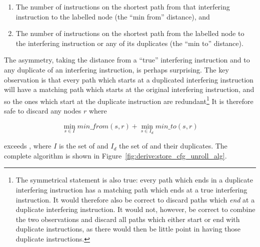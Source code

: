 \begin{enumerate}
\item
  The number of instructions on the shortest path from that
  interfering instruction to the labelled node (the ``min from''
  distance), and
\item
  The number of instructions on the shortest path from the labelled
  node to the interfering instruction or any of its duplicates (the
  ``min to'' distance).
\end{enumerate}


The asymmetry, taking the distance from a ``true'' interfering
instruction and to any duplicate of an interfering instruction, is
perhaps surprising.  The key observation is that every path which
starts at a duplicated interfering instruction will have a matching
path which starts at the original interfering instruction, and so the
ones which start at the duplicate instruction are
redundant\footnote{The symmetrical statement is also true: every path
  which ends in a duplicate interfering instruction has a matching
  path which ends at a true interfering instruction.  It would
  therefore also be correct to discard paths which \emph{end} at a
  duplicate interfering instruction.  It would not, however, be
  correct to combine the two observations and discard all paths which
  either start or end with duplicate instructions, as there would then
  be little point in having those duplicate instructions.}  It is
therefore safe to discard any nodes $r$ where

\begin{displaymath}
\min_{s \in I}\mathit{min\_from}(s, r) + \min_{s \in I_d}\mathit{min\_to}(s, r)
\end{displaymath}

exceeds \backref{$\alpha$}, where $I$ is the set of
 and $I_d$ the set of  and their duplicates.  The complete algorithm is shown in
Figure~\ref{fig:derive:store_cfg_unroll_alg}.

